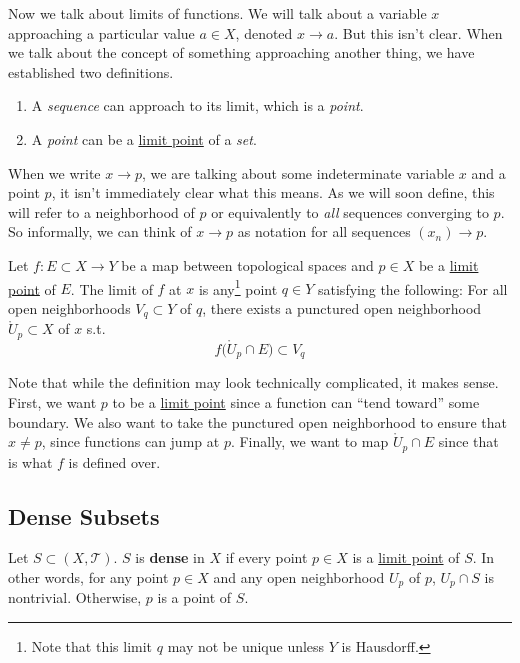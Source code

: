   Now we talk about limits of functions. We will talk about a variable $x$ approaching a particular value $a \in X$, denoted $x \to a$. But this isn't clear. When we talk about the concept of something approaching another thing, we have established two definitions. 
  \begin{enumerate}
    \item A \textit{sequence} can approach to its limit, which is a \textit{point}. 
    \item A \textit{point} can be a \hyperref[def:limit-point]{limit point} of a \textit{set}. 
  \end{enumerate} 
  When we write $x \to p$, we are talking about some indeterminate variable $x$ and a point $p$, it isn't immediately clear what this means. As we will soon define, this will refer to a neighborhood of $p$ or equivalently to \textit{all} sequences converging to $p$. So informally, we can think of $x \to p$ as notation for all sequences $(x_n) \to p$.   

  \begin{definition}
    \label{def:limfunc-top}
    Let $f: E \subset X \to Y$ be a map between topological spaces and $p \in X$ be a \hyperref[def:limit-point]{limit point} of $E$. The limit of $f$ at $x$ is any\footnote{Note that this limit $q$ may not be unique unless $Y$ is Hausdorff.} point $q \in Y$ satisfying the following: For all open neighborhoods $V_q \subset Y$ of $q$, there exists a punctured open neighborhood $\mathring{U}_p \subset X$ of $x$ s.t. 
    \begin{equation}
      f\big( \mathring{U}_p \cap E \big) \subset V_q
    \end{equation}
  \end{definition}

  Note that while the definition may look technically complicated, it makes sense. First, we want $p$ to be a \hyperref[def:limit-point]{limit point} since a function can ``tend toward'' some boundary. We also want to take the punctured open neighborhood to ensure that $x \neq p$, since functions can jump at $p$. Finally, we want to map $\mathring{U}_p \cap E$ since that is what $f$ is defined over. 

\subsection{Dense Subsets}

  \begin{definition}
    \label{def:dense-subsets}
    Let $S \subset (X, \mathscr{T})$. $S$ is \textbf{dense} in $X$ if every point $p \in X$ is a \hyperref[def:limit-point]{limit point} of $S$. In other words, for any point $p \in X$ and any open neighborhood $U_p$ of $p$, $U_p \cap S$ is nontrivial. Otherwise, $p$ is a point of $S$. 
  \end{definition}

